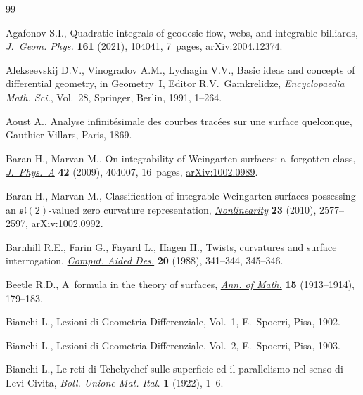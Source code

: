 \documentclass[pdftex]{sigma}
\numberwithin{equation}{section}
\begin{document}
\begin{thebibliography}{99}
\footnotesize\itemsep=0pt

Agafonov S.I., Quadratic integrals of geodesic flow, webs, and integrable
  billiards, \href{https://doi.org/10.1016/j.geomphys.2020.104041}{\textit{J.~Geom. Phys.}} \textbf{161} (2021), 104041, 7~pages,
  \href{https://arxiv.org/abs/2004.12374}{arXiv:2004.12374}.

Alekseevskij D.V., Vinogradov A.M., Lychagin V.V., Basic ideas and concepts of
  differential geometry, in Geometry~{I}, Editor R.V.~Gamkrelidze, \textit{Encyclopaedia Math. Sci.},
  Vol.~28, Springer, Berlin, 1991, 1--264.

Aoust A., Analyse infinit\'esimale des courbes trac\'ees sur une surface
  quelconque, Gauthier-Villars, Paris, 1869.

Baran H., Marvan M., On integrability of {W}eingarten surfaces: a~forgotten
  class, \href{https://doi.org/10.1088/1751-8113/42/40/404007}{\textit{J.~Phys.~A}} \textbf{42} (2009), 404007, 16~pages,
  \href{https://arxiv.org/abs/1002.0989}{arXiv:1002.0989}.

Baran H., Marvan M., Classification of integrable {W}eingarten surfaces
  possessing an {$\mathfrak{sl}(2)$}-valued zero curvature representation,
  \href{https://doi.org/10.1088/0951-7715/23/10/013}{\textit{Nonlinearity}} \textbf{23} (2010), 2577--2597, \href{https://arxiv.org/abs/1002.0992}{arXiv:1002.0992}.

Barnhill R.E., Farin G., Fayard L., Hagen H., Twists, curvatures and surface
  interrogation, \href{https://doi.org/10.1016/0010-4485(88)90116-9}{\textit{Comput. Aided Des.}} \textbf{20} (1988), 341--344,
  345--346.

Beetle R.D., A~formula in the theory of surfaces, \href{https://doi.org/10.2307/1967816}{\textit{Ann. of Math.}}
  \textbf{15} (1913--1914), 179--183.

Bianchi L., Lezioni di Geometria Differenziale, Vol.~1, E.~Spoerri, Pisa, 1902.

Bianchi L., Lezioni di Geometria Differenziale, Vol.~2, E.~Spoerri, Pisa, 1903.

Bianchi L., Le reti di {T}chebychef sulle superficie ed il parallelismo nel
  senso di {L}evi-{C}ivita, \textit{Boll. Unione Mat. Ital.} \textbf{1} (1922),
  1--6.


\end{thebibliography}
\end{document}

